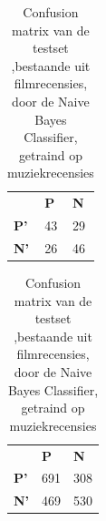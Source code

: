 \begin{table}
\centering
\setlength\tabcolsep{4pt}
\begin{minipage}[t]{0.48\textwidth}
\centering
\begin{tabular}{lll}
                                 & \textbf{P}               & \textbf{N}               \\ \cline{2-3} 
\multicolumn{1}{l|}{\textbf{P'}} & \multicolumn{1}{l|}{43} & \multicolumn{1}{l|}{29} \\ \cline{2-3} 
\multicolumn{1}{l|}{\textbf{N'}} & \multicolumn{1}{l|}{26} & \multicolumn{1}{l|}{46} \\ \cline{2-3} 
\end{tabular}
\caption{Confusion matrix van de testset, bestaande uit boekrecensies, door de  Naive Bayes Classifier, getraind op muziekrecensies} 
\end{minipage}%
\hfill
\begin{minipage}[t]{0.48\textwidth}
\centering
\begin{tabular}{lll}
                                 & \textbf{P}               & \textbf{N}               \\ \cline{2-3} 
\multicolumn{1}{l|}{\textbf{P'}} & \multicolumn{1}{l|}{691} & \multicolumn{1}{l|}{308} \\ \cline{2-3} 
\multicolumn{1}{l|}{\textbf{N'}} & \multicolumn{1}{l|}{469} & \multicolumn{1}{l|}{530} \\ \cline{2-3} 
\end{tabular}
\caption{Confusion matrix van de testset ,bestaande uit filmrecensies, door de  Naive Bayes Classifier, getraind op muziekrecensies} 
\end{minipage}
\end{table}

